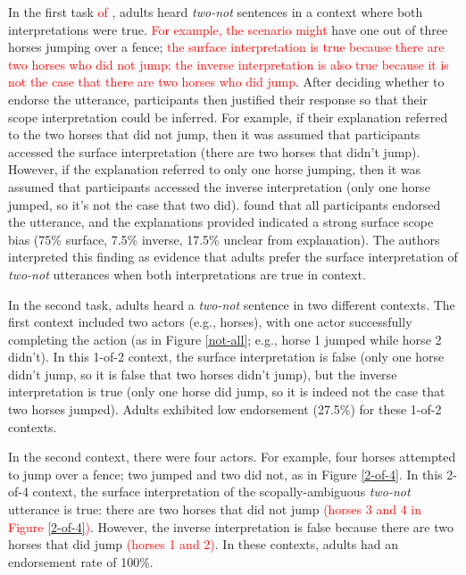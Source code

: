 \documentclass[preprint,authoryear]{elsarticle}\frenchspacing
\newcommand{\lsp}[1]{\textcolor{red}{[lsp: #1]}}
\newcommand{\lp}[1]{\textcolor{red}{#1}} %
\begin{document}
In the first task \lp{of \cite{musolinolidz2003}}, adults heard \emph{two-not} sentences in a context where both interpretations were true. 
\lp{For example, the scenario might} have one out of three horses jumping over a fence; 
\lp{the {surface} interpretation is true because there are two horses who did not jump; 
the {inverse} interpretation is also true because it is not the case that there are two horses who did jump}. 
After deciding whether to endorse the utterance, participants then justified their response so that their scope interpretation could be inferred. For example, if their explanation referred to the two horses that did not jump, then it was assumed that participants accessed the {surface} interpretation (there are two horses that didn't jump).
However, if the explanation referred to only one horse jumping, then it was assumed that participants accessed the {inverse} interpretation (only one horse jumped, so it's not the case that two did).
\citeauthor{musolinolidz2003} found that all participants endorsed the utterance, and the  explanations provided indicated a strong surface scope bias (75\% {surface}, 7.5\% {inverse}, 17.5\% unclear from explanation). The authors interpreted this finding as evidence that adults prefer the {surface} interpretation of \emph{two-not} utterances when both interpretations are true in context. 

In the second task, adults heard a \emph{two-not} sentence in two different contexts. The first context included two actors (e.g., horses), with one actor successfully completing the action (as in Figure \ref{not-all}; e.g., horse 1 jumped while horse 2 didn't). In this 1-of-2 context, the {surface} interpretation is false (only one horse didn't jump, so it is false that two horses didn't jump), but the {inverse} interpretation is true (only one horse did jump, so it is indeed not the case that two horses jumped). Adults exhibited low endorsement (27.5\%) for these 1-of-2 contexts. 

In the second context, there were four actors. For example, four horses attempted to jump over a fence; two jumped %
and two did not, %
as in Figure \ref{2-of-4}.  In this 2-of-4 context, the {surface} interpretation of the scopally-ambiguous \emph{two-not} utterance is true: there are two horses that did not jump \lp{(horses 3 and 4 in Figure \ref{2-of-4})}. However, the {inverse} interpretation is false because there are two horses that did jump \lp{(horses 1 and 2)}. In these contexts, adults had an endorsement rate of 100\%. 
\end{document}

